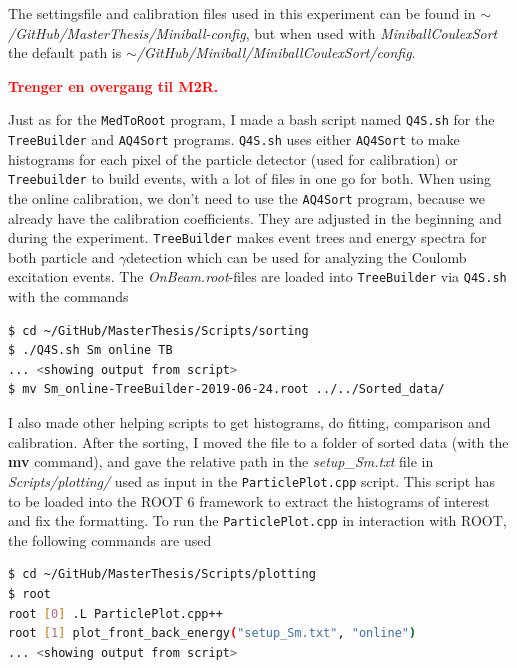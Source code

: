 \documentclass[twoside,english]{uiofysmaster/uiofysmaster}
\newcommand{\ga}{$\gamma$}
\begin{document}
The settingsfile and calibration files used in this experiment can be found in \textit{$\sim$/GitHub/MasterThesis/Miniball-config}, but when used with \textsl{MiniballCoulexSort} the default path is \textit{$\sim$/GitHub/Miniball/MiniballCoulexSort/config}.


\bigskip

\textcolor{red}{\textbf{Trenger en overgang til M2R.}}

\bigskip



Just as for the \texttt{MedToRoot} program, I made a bash script named \texttt{Q4S.sh} for the \texttt{TreeBuilder} and \texttt{AQ4Sort} programs. 
\texttt{Q4S.sh} uses either \texttt{AQ4Sort} to make histograms for each pixel of the particle detector (used for calibration) or \texttt{Treebuilder} to build events, with a lot of files in one go for both. 
When using the online calibration, we don't need to use the \texttt{AQ4Sort} program, because we already have the calibration coefficients. 
They are adjusted in the beginning and during the experiment.
\texttt{TreeBuilder} makes event trees and energy spectra for both particle and \ga detection which can be used for analyzing the Coulomb excitation events.
The \textit{OnBeam.root}-files are loaded into \texttt{TreeBuilder} via \texttt{Q4S.sh} with the commands

\begin{lstlisting}[language=sh]
$ cd ~/GitHub/MasterThesis/Scripts/sorting 
$ ./Q4S.sh Sm online TB
... <showing output from script>
$ mv Sm_online-TreeBuilder-2019-06-24.root ../../Sorted_data/
\end{lstlisting}

I also made other helping scripts to get histograms, do fitting, comparison and calibration. 
After the sorting, I moved the file to a folder of sorted data (with the \textbf{mv} command), and gave the relative path in the \textit{setup\_Sm.txt} file in \textit{Scripts/plotting/} used as input in the \texttt{ParticlePlot.cpp} script. 
This script has to be loaded into the ROOT 6 framework to extract the histograms of interest and fix the formatting.
To run the \texttt{ParticlePlot.cpp} in interaction with ROOT, the following commands are used

\begin{lstlisting}[language=sh]
$ cd ~/GitHub/MasterThesis/Scripts/plotting 
$ root
root [0] .L ParticlePlot.cpp++
root [1] plot_front_back_energy("setup_Sm.txt", "online")
... <showing output from script>
\end{lstlisting}
\end{document}

